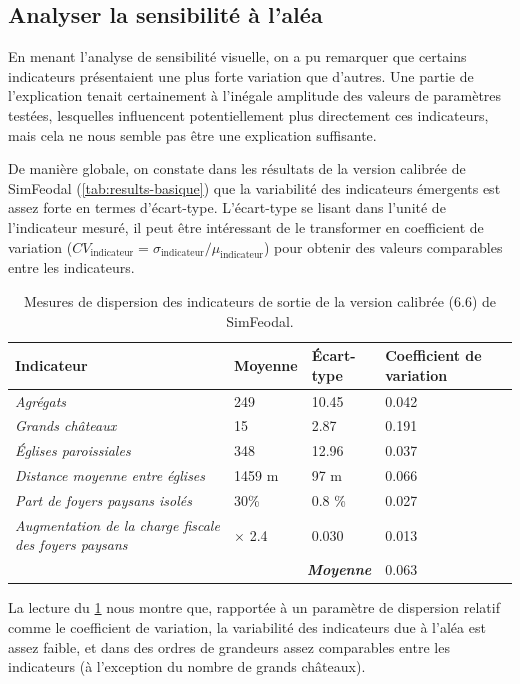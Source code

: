 \subsection{Analyser la sensibilité à l'aléa}

En menant l'analyse de sensibilité visuelle, on a pu remarquer que certains indicateurs présentaient une plus forte variation que d'autres.
Une partie de l'explication tenait certainement à l'inégale amplitude des valeurs de paramètres testées, lesquelles influencent potentiellement plus directement ces indicateurs, mais cela ne nous semble pas être une explication suffisante.

De manière globale, on constate dans les résultats de la version calibrée de SimFeodal (\cref{tab:results-basique}) que la variabilité des indicateurs émergents est assez forte en termes d'écart-type.
L'écart-type se lisant dans l'unité de l'indicateur mesuré, il peut être intéressant de le transformer en coefficient de variation ($CV_{\text{indicateur}} = \sigma_{\text{indicateur}}  /  \mu_{\text{indicateur}}$) pour obtenir des valeurs comparables entre les indicateurs. 


\begin{table}[H]
{\renewcommand{\arraystretch}{1.1}%
	\begin{tabular}{|p{5cm}|p{2.5cm}|p{2.5cm}|p{2.5cm}|}
\hline
\textbf{Indicateur} & \textbf{Moyenne} & \textbf{Écart-type} & \textbf{Coefficient de variation} \\
\hline
\textit{Agrégats} & 249 & 10.45 & 0.042\\
\hline
\textit{Grands châteaux} & 15 & 2.87 & 0.191\\
\hline
\textit{Églises paroissiales} & 348 & 12.96 & 0.037\\
\hline
\textit{Distance moyenne entre églises} & 1459 m & 97 m & 0.066\\
\hline
\textit{Part de foyers paysans isolés} & 30\% & 0.8 \% & 0.027\\
\hline
\textit{Augmentation de la charge fiscale des foyers paysans} & $\times$ 2.4 & 0.030 & 0.013\\
\hline
\multicolumn{3}{r|}{\textbf{\textit{Moyenne}}} & 0.063\\
\cline{4-4}
	\end{tabular}
}
\caption{Mesures de dispersion des indicateurs de sortie de la version calibrée (6.6) de SimFeodal.}
\label{tab:variabilite-indicateurs}
\end{table}

La lecture du \cref{tab:variabilite-indicateurs} nous montre que, rapportée à un paramètre de dispersion relatif comme le coefficient de variation, la variabilité des indicateurs due à l'aléa est assez faible, et dans des ordres de grandeurs assez comparables entre les indicateurs (à l'exception du nombre de grands châteaux).

